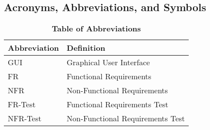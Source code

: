 \documentclass[12pt, titlepage]{article}
\begin{document}
\subsection{Acronyms, Abbreviations, and Symbols}
	
\begin{table}[hbp]
\caption{\textbf{Table of Abbreviations}} \label{Table}

\begin{tabularx}{\textwidth}{p{3cm}X}
\toprule
\textbf{Abbreviation} & \textbf{Definition} \\
\midrule
GUI & Graphical User Interface\\
FR & Functional Requirements \\
NFR & Non-Functional Requirements \\ 
FR-Test& Functional Requirements Test\\
NFR-Test& Non-Functional Requirements Test\\ 
\bottomrule
\end{tabularx}

\end{table}
\end{document}
